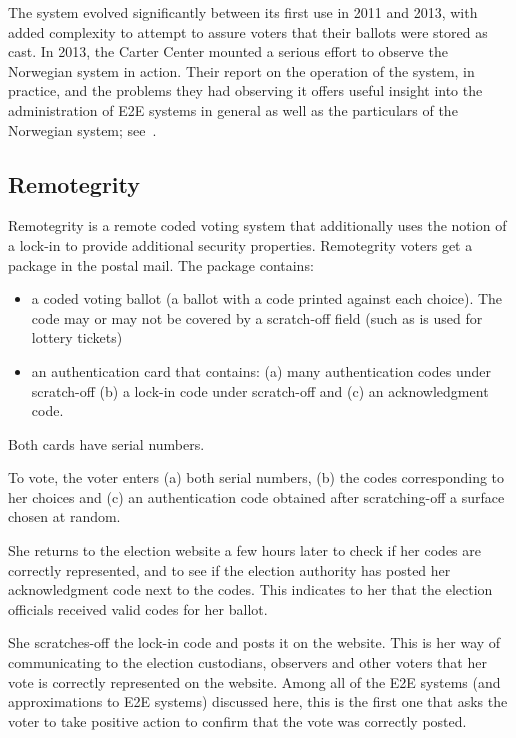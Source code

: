The system evolved significantly between its first use in 2011 and
2013, with added complexity to attempt to assure voters that their
ballots were stored as cast. In 2013, the Carter Center mounted a
serious effort to observe the Norwegian system in action. Their
report on the operation of the system, in practice, and the problems
they had observing it offers useful insight into the administration of
E2E systems in general as well as the particulars of the Norwegian
system; see~\cite{carter2013}.

\subsection{Remotegrity~\cite{zagorski2013}}

Remotegrity is a remote coded voting system that additionally uses the
notion of a lock-in to provide additional security
properties. Remotegrity voters get a package in the postal mail. The
package contains:
\begin{itemize}
  \item a coded voting ballot (a ballot with a code printed against
    each choice). The code may or may not be covered by a scratch-off
    field (such as is used for lottery tickets)
  \item an authentication card that contains: (a) many authentication
    codes under scratch-off (b) a lock-in code under scratch-off and
    (c) an acknowledgment code.
\end{itemize}
Both cards have serial numbers.

To vote, the voter enters (a) both serial numbers, (b) the codes
corresponding to her choices and (c) an authentication code obtained
after scratching-off a surface chosen at random.

She returns to the election website a few hours later to check if her
codes are correctly represented, and to see if the election authority
has posted her acknowledgment code next to the codes. This indicates
to her that the election officials received valid codes for her
ballot.

She scratches-off the lock-in code and posts it on the website. This
is her way of communicating to the election custodians, observers and
other voters that her vote is correctly represented on the
website. Among all of the E2E systems (and approximations to E2E
systems) discussed here, this is the first one that asks the voter to
take positive action to confirm that the vote was correctly posted.

